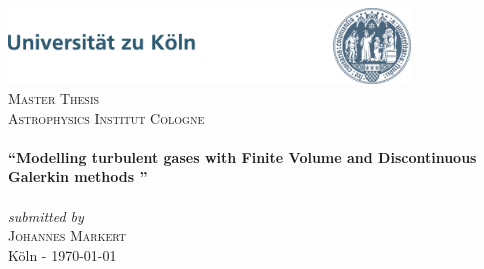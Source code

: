 \newcommand{\expNr}{04}
\newcommand{\expTitle}{}
\newcommand{\releaseDate}{\today}

\begin{titlepage}
\begin{center}

\includegraphics[width=0.8\textwidth]{./frp/uni_koeln_logo.jpg}\\[1.0cm]  

\textsc{\LARGE Master Thesis}
\textsc{\Large }\\[0.8cm]
\textsc{\Large Astrophysics Institut Cologne}\\[0.5cm]

\HRule\\[0.7cm]
{ \LARGE \bfseries \textquotedblleft Modelling turbulent gases with Finite Volume and Discontinuous Galerkin methods \textquotedblright}\\[0.4cm]
\HRule \\[0.7cm]

\large \emph{submitted by}\\[0.4cm]
\textsc{\LARGE Johannes Markert}\\[1cm]

\vfill
K\"oln - \releaseDate 

\end{center}
\end{titlepage}


\cleardoubleemptypage
